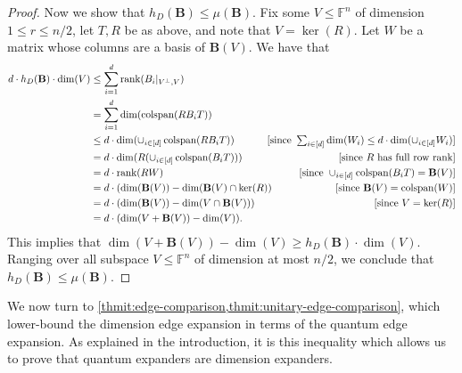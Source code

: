 \documentclass[11pt]{article}
\theoremstyle{plain}
\numberwithin{equation}{section}
\theoremstyle{definition}
\newcommand{\F}{\mathbb{F}}
\newcommand{\rk}{\mathrm{rank}}
\newcommand{\tuple}[1]{\mathbf{#1}}
\newcommand{\vB}{\tuple{B}}
\newcommand{\colspan}{\operatorname{colspan}}
\newcommand{\ann}{V^{\perp}}
\DeclareMathOperator{\rank}{rank}
\begin{document}
\begin{proof}
  Now we show that $ h_D(\vB)\leq \mu(\vB)$. Fix some $V\leq \F^n$ of dimension $1\leq r\leq n/2$, let $T,R$ be as above, and note that $V=\ker(R)$. Let $W$ be a matrix whose columns are a basis of $\vB(V)$. 
  We have that
%
%
  \begin{align*}
    d\cdot h_D(\vB)\cdot\dim(V)  &\leq  \sum_{i=1}^d\rk(B_i|_{\ann, V}) \\
    & =  \sum_{i=1}^d\dim(\colspan(RB_iT)) \\
    & \leq d\cdot\dim(\cup_{i\in[d]}\colspan(RB_iT)) & \hspace{-14.6pt}[\text{since }\textstyle\sum_{i\in[d]}\dim(W_i)\leq d\cdot \dim(\cup_{i\in[d]}W_i) ]\\
    & =  d\cdot\dim(R(\cup_{i\in[d]}\colspan(B_iT)))& [\text{since }R\text{ has full row rank} ]\\
    & =  d\cdot\rank(RW) &[\text{since }\cup_{i\in[d]} \colspan(B_iT)=\vB(V) ]\\
    & =  d\cdot(\dim(\vB(V))-\dim(\vB(V) \cap \ker(R)) & [\text{since }\vB(V)=\colspan(W)]\\
    & =  d\cdot(\dim(\vB(V))-\dim(V\cap\vB(V))) & [\text{since }V=\ker(R)]\\
    & =  d\cdot(\dim(V+\vB(V))-\dim(V)).
  \end{align*}
  This implies that $\dim(V+\vB(V))-\dim (V)\geq h_D(\vB)\cdot \dim(V)$. Ranging over all subspace $V\leq\F^n$ of dimension at most $n/2$,
  we conclude that $ h_D(\vB)\leq \mu(\vB)$.
\end{proof} 

We now turn to \cref{thmit:edge-comparison,thmit:unitary-edge-comparison}, which lower-bound the dimension edge expansion in terms of the quantum edge expansion. As explained in the introduction, it is this inequality which allows us to prove that quantum expanders are dimension expanders.
\end{document}
